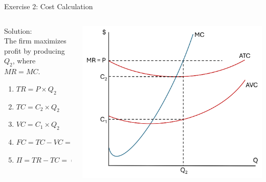 \documentclass[9pt]{beamer}
\begin{document}
\begin{frame}{Exercise 2: Cost Calculation}
    \begin{columns}[c]
        \begin{column}{0.5\textwidth}
        Solution:\\
        \vspace{10pt}
        The firm maximizes profit by producing $Q_2$, where $MR = MC$.
        \vspace{5pt}
            \begin{enumerate}
                \item $TR = P \times Q_2$
                \item $TC = C_2 \times Q_2$
                \item $VC = C_1 \times Q_2$
                \item $FC = TC - VC = (C_2 - C_1) \times Q_2$
                \item $\Pi = TR - TC = (P - C_2) \times Q_2$
            \end{enumerate}
        \end{column}
        \begin{column}{0.5\textwidth}
            \includegraphics[width=\linewidth]{cost_exercise.png}
        \end{column}
    \end{columns}
\end{frame}
\end{document}
